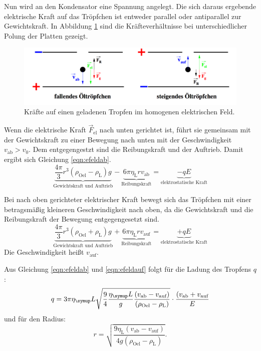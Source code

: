 Nun wird an den Kondensator eine Spannung angelegt. Die sich daraus ergebende
elektrische Kraft auf das Tröpfchen ist entweder parallel oder antiparallel zur
Gewichtskraft.
In Abbildung \ref{fig:troepfchenimefeld} sind die Kräfteverhältnisse
bei unterschiedlicher Polung der Platten gezeigt.
\begin{figure}
  \centering
  \includegraphics[width = \textwidth]{PicturePerfect/troepfchenimefeld.pdf}
  \caption{Kräfte auf einen geladenen Tropfen im homogenen elektrischen Feld.\cite{anleitung}}
  \label{fig:troepfchenimefeld}
\end{figure}
Wenn die elektrische Kraft $\vec{F}_\text{el}$ nach unten gerichtet ist, führt sie gemeinsam mit
der Gewichtskraft zu einer Bewegung nach unten mit der Geschwindigkeit $v_\text{ab} > v_0$. Dem entgegengestzt sind die
Reibungskraft und der Auftrieb. Damit ergibt sich Gleichung \eqref{eqn:efeldab}.
\begin{equation}
  \underbrace{\frac{4\pi}{3} r^3 (\rho_\text{Oel}-\rho_\text{L})g}_\text{Gewichtskraft und Auftrieb}
  - \underbrace{6 \pi \eta_\text{L} r v_\text{ab}}_\text{Reibungskraft}
  = \underbrace{-q E}_\text{elektrostatische Kraft}
  \label{eqn:efeldab}
\end{equation}

Bei nach oben gerichteter elektrischer Kraft bewegt sich das Tröpfchen mit einer betragsmäßig kleineren
Geschwindigkeit nach oben, da die Gewichtskraft und die Reibungskraft der Bewegung entgegengesetzt sind.
\begin{equation}
  \underbrace{\frac{4\pi}{3} r^3 (\rho_\text{Oel}+\rho_\text{L})g}_\text{Gewichtskraft und Auftrieb}
  + \underbrace{6 \pi \eta_\text{L} r v_\text{auf}}_\text{Reibungskraft}
  = \underbrace{+ q E}_\text{elektrostatische Kraft}
  \label{eqn:efeldauf}
\end{equation}
Die Geschwindigkeit heißt $v_\text{auf}$.

Aus Gleichung \eqref{eqn:efeldab} und \eqref{eqn:efeldauf} folgt für die Ladung
des Tropfens $q$:
\begin{equation}
  q = 3 \pi \eta_\g{L} \sqrt{\frac{9}{4}\frac{\eta_\g{L}}{g}\frac{(v_\text{ab}-v_\text{auf})}{(\rho_\text{Oel}-\rho_\text{L})}}
  \cdot \frac{(v_\text{ab} + v_\text{auf}}{E}
  \label{eqn:ladung}
\end{equation}
und für den Radius:
\begin{equation}
  r = \sqrt{\frac{9 \eta_\text{L} (v_\text{ab}-v_\text{auf})}{4 g (\rho_\text{Oel}-\rho_\text{L})}}.
\end{equation}

